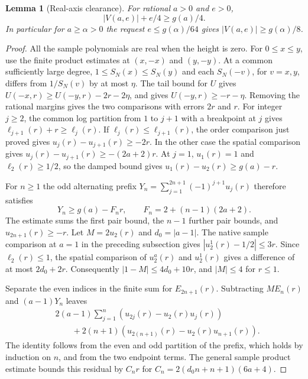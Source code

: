 \documentclass[11pt]{amsart}
\newtheorem{lemma}[theorem]{Lemma}
\theoremstyle{definition}
\theoremstyle{remark}
\numberwithin{equation}{section}
\begin{document}
\begin{lemma}[Real-axis clearance]\label{lem:real-axis}
For rational $a>0$ and $e>0$,
\[
        |V(a,e)|+e/4\ge g(a)/4 .
\]
In particular for $a\ge\alpha>0$ the request $e\le g(\alpha)/64$
gives $|V(a,e)|\ge g(\alpha)/8$.
\end{lemma}
\begin{proof}
All the sample polynomials are real when the height is zero.
For $0\le x\le y$, use the finite product estimates at $(x,-x)$
and $(y,-y)$. At a common sufficiently large degree,
$1\le S_N(x)\le S_N(y)$ and each $S_N(-v)$, for $v=x,y$,
differs from $1/S_N(v)$ by at most $\eta$.
The tail bound for $U$ gives $U(-x,r)\ge U(-y,r)-2r-2\eta$,
and gives $U(-y,r)\ge-r-\eta$.
Removing the rational margins gives the two comparisons with
errors $2r$ and $r$.
For integer $j\ge2$, the common log partition from $1$ to
$j+1$ with a breakpoint at $j$ gives
$\ell_{j+1}(r)+r\ge\ell_j(r)$.
If $\ell_j(r)\le\ell_{j+1}(r)$, the order comparison just
proved gives $u_j(r)-u_{j+1}(r)\ge-2r$.
In the other case the spatial comparison gives
$u_j(r)-u_{j+1}(r)\ge-(2a+2)r$.
At $j=1$, $u_1(r)=1$ and $\ell_2(r)\ge1/2$, so the
damped bound gives $u_1(r)-u_2(r)\ge g(a)-r$.

For $n\ge1$ the odd alternating prefix
$Y_n=\sum_{j=1}^{2n+1}(-1)^{j+1}u_j(r)$ therefore satisfies
\[
 Y_n\ge g(a)-F_n r,\qquad F_n=2+(n-1)(2a+2).
\]
The estimate sums the first pair bound, the $n-1$ further
pair bounds, and $u_{2n+1}(r)\ge-r$.
Let $M=2u_2(r)$ and $d_0=|a-1|$.
The native sample comparison at $a=1$ in the preceding
subsection gives $|u_2^1(r)-1/2|\le3r$. Since
$\ell_2(r)\le1$, the spatial comparison of $u_2^a(r)$
and $u_2^1(r)$ gives a difference of at most $2d_0+2r$.
Consequently $|1-M|\le4d_0+10r$, and $|M|\le4$ for $r\le1$.

Separate the even indices in the finite sum for $E_{2n+1}(r)$.
Subtracting $M E_n(r)$ and $(a-1)Y_n$ leaves
\begin{align*}
 &2(a-1)\sum_{j=1}^n (u_{2j}(r)-u_2(r)u_j(r))\\
 &\qquad{}+2(n+1)(u_{2(n+1)}(r)-u_2(r)u_{n+1}(r)).
\end{align*}
The identity follows from the even and odd partition of the
prefix, which holds by induction on $n$, and from the
two endpoint terms. The general sample product estimate
bounds this residual by $C_n r$ for
$C_n=2(d_0 n+n+1)(6a+4)$.


\end{proof}
\end{document}
